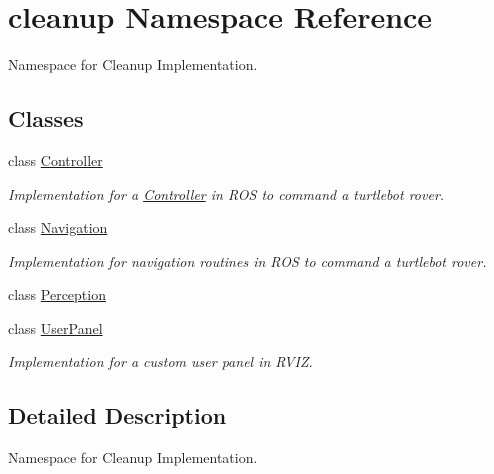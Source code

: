 \hypertarget{namespacecleanup}{}\section{cleanup Namespace Reference}
\label{namespacecleanup}


Namespace for Cleanup Implementation.  


\subsection*{Classes}
\begin{DoxyCompactItemize}
\item 
class \hyperlink{classcleanup_1_1_controller}{Controller}
\begin{DoxyCompactList}\small\item\em Implementation for a \hyperlink{classcleanup_1_1_controller}{Controller} in R\+OS to command a turtlebot rover. \end{DoxyCompactList}\item 
class \hyperlink{classcleanup_1_1_navigation}{Navigation}
\begin{DoxyCompactList}\small\item\em Implementation for navigation routines in R\+OS to command a turtlebot rover. \end{DoxyCompactList}\item 
class \hyperlink{classcleanup_1_1_perception}{Perception}
\item 
class \hyperlink{classcleanup_1_1_user_panel}{User\+Panel}
\begin{DoxyCompactList}\small\item\em Implementation for a custom user panel in R\+V\+IZ. \end{DoxyCompactList}\end{DoxyCompactItemize}


\subsection{Detailed Description}
Namespace for Cleanup Implementation. 
